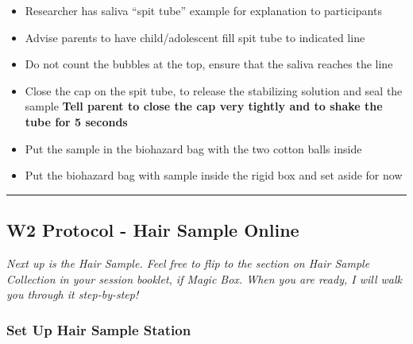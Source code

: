 \documentclass[
]{book}
\begin{document}
\begin{itemize}
\item
  Researcher has saliva ``spit tube'' example for explanation to participants
\item
  Advise parents to have child/adolescent fill spit tube to indicated line
\item
  Do not count the bubbles at the top, ensure that the saliva reaches the line
\item
  Close the cap on the spit tube, to release the stabilizing solution and seal the sample
  \textbf{Tell parent to close the cap very tightly and to shake the tube for 5 seconds}
\item
  Put the sample in the biohazard bag with the two cotton balls inside
\item
  Put the biohazard bag with sample inside the rigid box and set aside for now
\end{itemize}

\begin{center}\rule{0.5\linewidth}{0.5pt}\end{center}

\hypertarget{w2-protocol---hair-sample-online}{%
\subsection{W2 Protocol - Hair Sample Online}\label{w2-protocol---hair-sample-online}}

\emph{Next up is the Hair Sample. Feel free to flip to the section on Hair Sample Collection in your session booklet, if Magic Box. When you are ready, I will walk you through it step-by-step!}

\hypertarget{set-up-hair-sample-station-2}{%
\subsubsection{Set Up Hair Sample Station}\label{set-up-hair-sample-station-2}}
\end{document}
